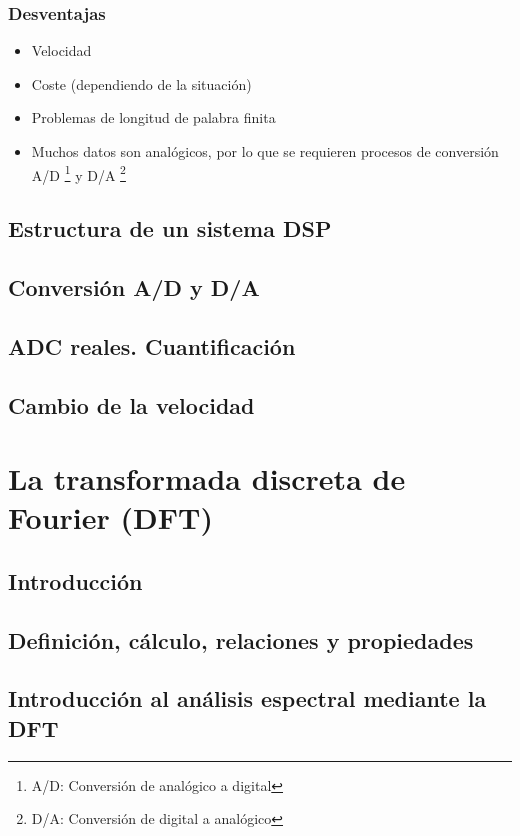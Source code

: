 \documentclass[a4paper]{book}
\begin{document}
\subsection{Desventajas}
\begin{itemize}
	 \item Velocidad
	 \item Coste (dependiendo de la situación)
	 \item Problemas de longitud de palabra finita
	 \item Muchos datos son analógicos, por lo que se requieren procesos de conversión A/D \footnote{A/D: Conversión de analógico a digital} y D/A \footnote{D/A: Conversión de digital a analógico}
\end{itemize}

\section{Estructura de un sistema DSP}

\section{Conversión A/D y D/A}

\section{ADC reales. Cuantificación}

\section{Cambio de la velocidad}


\chapter{La transformada discreta de Fourier (DFT)}

\section{Introducción}

\section{Definición, cálculo, relaciones y propiedades}

\section{Introducción al análisis espectral mediante la DFT}
\end{document}

